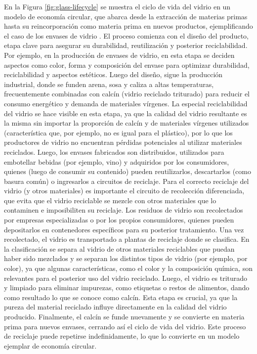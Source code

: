 En la Figura \ref{fig:glass-lifecycle} se muestra el ciclo de vida del vidrio en un modelo de economía circular, que abarca desde la extracción de materias primas hasta su reincorporación como materia prima en nuevos productos, ejemplificando el caso de los envases de vidrio \cite{prodvidrio2024verallia}. El proceso comienza con el diseño del producto, etapa clave para asegurar su durabilidad, reutilización y posterior reciclabilidad. Por ejemplo, en la producción de envases de vidrio, en esta etapa se deciden aspectos como color, forma y composición del envase para optimizar durabilidad, reciclabilidad y aspectos estéticos. Luego del diseño, sigue la producción industrial, donde se funden arena, sosa y caliza a altas temperaturas, frecuentemente combinadas con calcín (vidrio reciclado triturado) para reducir el consumo energético y demanda de materiales vírgenes. La especial reciclabilidad del vidrio se hace visible en esta etapa, ya que la calidad del vidrio resultante es la misma sin importar la proporción de calcín y de materiales vírgenes utilizados (característica que, por ejemplo, no es igual para el plástico), por lo que los productores de vidrio no encuentran pérdidas potenciales al utilizar materiales reciclados. Luego, los envases fabricados son distribuidos, utilizados para embotellar bebidas (por ejemplo, vino) y adquiridos por los consumidores, quienes (luego de consumir su contenido) pueden reutilizarlos, descartarlos (como basura común) o ingresarlos a circuitos de reciclaje. Para el correcto reciclaje del vidrio (y otros materiales) es importante el circuito de recolección diferenciada, que evita que el vidrio reciclable se mezcle con otros materiales que lo contaminen e imposibiliten su reciclaje. Los residuos de vidrio son recolectados por empresas especializadas o por los propios consumidores, quienes pueden depositarlos en contenedores específicos para su posterior tratamiento.
Una vez recolectado, el vidrio es transportado a plantas de reciclaje donde se clasifica. En la clasificación se separa al vidrio de otros materiales reciclables que puedan haber sido mezclados y se separan los distintos tipos de vidrio (por ejemplo, por color), ya que algunas características, como el color y la composición química, son relevantes para el posterior uso del vidrio reciclado. Luego, el vidrio es triturado y limpiado para eliminar impurezas, como etiquetas o restos de alimentos, dando como resultado lo que se conoce como calcín. Esta etapa es crucial, ya que la pureza del material reciclado influye directamente en la calidad del vidrio producido. Finalmente, el calcín se funde nuevamente y se convierte en materia prima para nuevos envases, cerrando así el ciclo de vida del vidrio. Este proceso de reciclaje puede repetirse indefinidamente, lo que lo convierte en un modelo ejemplar de economía circular.


